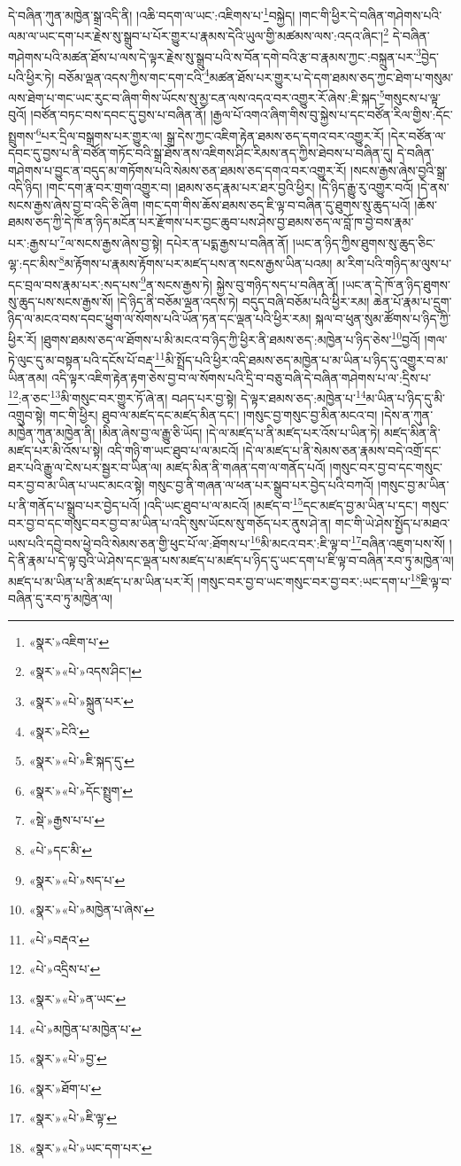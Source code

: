 དེ་བཞིན་ཀུན་མཁྱེན་སྒྲ་འདི་ནི། །འཆི་བདག་ལ་ཡང་:འཇིགས་པ་\footnote{«སྣར་»འཇིག་པ་}བསྐྱེད། །གང་གི་ཕྱིར་དེ་བཞིན་གཤེགས་པའི་ལམ་ལ་ཡང་དག་པར་རྗེས་སུ་སྒྲུབ་པ་པོར་གྱུར་པ་རྣམས་དེའི་ཡུལ་གྱི་མཚམས་ལས་:འདའ་ཞིང་།\footnote{«སྣར་»«པེ་»འདས་ཤིང་།} དེ་བཞིན་གཤེགས་པའི་མཚན་ཐོས་པ་ལས་དེ་ལྟར་རྗེས་སུ་སྒྲུབ་པའི་ས་བོན་དགེ་བའི་རྩ་བ་རྣམས་ཀྱང་:བསྐྲུན་པར་\footnote{«སྣར་»«པེ་»སྐྲུན་པར་}བྱེད་པའི་ཕྱིར་ཏེ། བཅོམ་ལྡན་འདས་ཀྱིས་གང་དག་ངའི་\footnote{«སྣར་»ངེའི་}མཚན་ཐོས་པར་གྱུར་པ་དེ་དག་ཐམས་ཅད་ཀྱང་ཐེག་པ་གསུམ་ལས་ཐེག་པ་གང་ཡང་རུང་བ་ཞིག་གིས་ཡོངས་སུ་མྱ་ངན་ལས་འདའ་བར་འགྱུར་རོ་ཞེས་:ཇི་སྐད་\footnote{«སྣར་»«པེ་»ཇི་སྐད་དུ་}གསུངས་པ་ལྟ་བུའོ། །བཙོན་བཏང་བས་དབང་དུ་བྱས་པ་བཞིན་ནོ། །རྒྱལ་པོ་འགའ་ཞིག་གིས་བུ་སྐྱེས་པ་དང་བཙོན་རིལ་གྱིས་:དོང་སྤྲུགས་\footnote{«སྣར་»«པེ་»དོང་སྤྲུག་}པར་དྲིལ་བསྒྲགས་པར་གྱུར་ལ། སྒྲ་དེས་ཀྱང་འཇིག་རྟེན་ཐམས་ཅད་དགའ་བར་འགྱུར་རོ། །དེར་བཙོན་ལ་དབང་དུ་བྱས་པ་ནི་བཙོན་གཏོང་བའི་སྒྲ་ཐོས་ནས་འཇིགས་ཤིང་རིམས་ནད་ཀྱིས་ཐེབས་པ་བཞིན་དུ། དེ་བཞིན་གཤེགས་པ་བྱུང་ན་བདུད་མ་གཏོགས་པའི་སེམས་ཅན་ཐམས་ཅད་དགའ་བར་འགྱུར་རོ། །སངས་རྒྱས་ཞེས་བྱའི་སྒྲ་འདི་ཉིད། །གང་དག་རྣ་བར་གྲག་འགྱུར་བ། །ཐམས་ཅད་རྣམ་པར་ཐར་བྱའི་ཕྱིར། །དེ་ཉིད་རྒྱུ་རུ་འགྱུར་བའོ། །དེ་ནས་སངས་རྒྱས་ཞེས་བྱ་བ་འདི་ཅི་ཞིག །གང་དག་གིས་ཆོས་ཐམས་ཅད་ཇི་ལྟ་བ་བཞིན་དུ་ཐུགས་སུ་ཆུད་པའོ། །ཆོས་ཐམས་ཅད་ཀྱི་དེ་ཁོ་ན་ཉིད་མངོན་པར་རྫོགས་པར་བྱང་ཆུབ་པས་ཤེས་བྱ་ཐམས་ཅད་ལ་བློ་ཁ་བྱེ་བས་རྣམ་པར་:རྒྱས་པ་\footnote{«སྡེ་»རྒྱས་པ་པ་}ལ་སངས་རྒྱས་ཞེས་བྱ་སྟེ། དཔེར་ན་པདྨ་རྒྱས་པ་བཞིན་ནོ། །ཡང་ན་ཉིད་ཀྱིས་ཐུགས་སུ་ཆུད་ཅིང་ལྷ་:དང་མིས་\footnote{«པེ་»དང་མི་}མ་རྟོགས་པ་རྣམས་རྟོགས་པར་མཛད་པས་ན་སངས་རྒྱས་ཡིན་པའམ། མ་རིག་པའི་གཉིད་མ་ལུས་པ་དང་བྲལ་བས་རྣམ་པར་:སད་པས་\footnote{«སྣར་»«པེ་»སད་པ་}ན་སངས་རྒྱས་ཏེ། སྐྱེས་བུ་གཉིད་སད་པ་བཞིན་ནོ། །ཡང་ན་དེ་ཁོ་ན་ཉིད་ཐུགས་སུ་ཆུད་པས་སངས་རྒྱས་སོ། །དེ་ཉིད་ནི་བཅོམ་ལྡན་འདས་ཏེ། བདུད་བཞི་བཅོམ་པའི་ཕྱིར་རམ། ཆེན་པོ་རྣམ་པ་དྲུག་ཉིད་ལ་མངའ་བས་དབང་ཕྱུག་ལ་སོགས་པའི་ཡོན་ཏན་དང་ལྡན་པའི་ཕྱིར་རམ། སྐལ་བ་ཕུན་སུམ་ཚོགས་པ་ཉིད་ཀྱི་ཕྱིར་རོ། །ཐུགས་ཐམས་ཅད་ལ་ཐོགས་པ་མི་མངའ་བ་ཉིད་ཀྱི་ཕྱིར་ནི་ཐམས་ཅད་:མཁྱེན་པ་ཉིད་ཅེས་\footnote{«སྣར་»«པེ་»མཁྱེན་པ་ཞེས་}བྱའོ། །གལ་ཏེ་ལུང་དུ་མ་བསྟན་པའི་དངོས་པོ་བརྡ་\footnote{«པེ་»བརྡའ་}མི་སྤྲོད་པའི་ཕྱིར་འདི་ཐམས་ཅད་མཁྱེན་པ་མ་ཡིན་པ་ཉིད་དུ་འགྱུར་བ་མ་ཡིན་ནམ། འདི་ལྟར་འཇིག་རྟེན་རྟག་ཅེས་བྱ་བ་ལ་སོགས་པའི་དྲི་བ་བཅུ་བཞི་དེ་བཞིན་གཤེགས་པ་ལ་:དྲིས་པ་\footnote{«པེ་»འདྲིས་པ་}:ན་ཅང་\footnote{«སྣར་»«པེ་»ན་ཡང་}མི་གསུང་བར་གྱུར་ཏོ་ཞེ་ན། བཤད་པར་བྱ་སྟེ། དེ་ལྟར་ཐམས་ཅད་:མཁྱེན་པ་\footnote{«པེ་»མཁྱེན་པ་མཁྱེན་པ་}མ་ཡིན་པ་ཉིད་དུ་མི་འགྲུབ་སྟེ། གང་གི་ཕྱིར། ཐུབ་ལ་མཛད་དང་མཛད་མིན་དང་། །གསུང་བྱ་གསུང་བྱ་མིན་མངའ་བ། །དེས་ན་ཀུན་མཁྱེན་ཀུན་མཁྱེན་ནི། །མིན་ཞེས་བྱ་ལ་རྒྱུ་ཅི་ཡོད། །དེ་ལ་མཛད་པ་ནི་མཛད་པར་འོས་པ་ཡིན་ཏེ། མཛད་མིན་ནི་མཛད་པར་མི་འོས་པ་སྟེ། འདི་གཉི་ག་ཡང་ཐུབ་པ་ལ་མངའོ། །དེ་ལ་མཛད་པ་ནི་སེམས་ཅན་རྣམས་བདེ་འགྲོ་དང་ཐར་པའི་རྒྱུ་ལ་ངེས་པར་སྦྱར་བ་ཡིན་ལ། མཛད་མིན་ནི་གཞན་དག་ལ་གནོད་པའོ། །གསུང་བར་བྱ་བ་དང་གསུང་བར་བྱ་བ་མ་ཡིན་པ་ཡང་མངའ་སྟེ། གསུང་བྱ་ནི་གཞན་ལ་ཕན་པར་སྒྲུབ་པར་བྱེད་པའི་བཀའོ། །གསུང་བྱ་མ་ཡིན་པ་ནི་གནོད་པ་སྒྲུབ་པར་བྱེད་པའོ། །འདི་ཡང་ཐུབ་པ་ལ་མངའོ། །མཛད་བ་\footnote{«སྣར་»«པེ་»བྱ་}དང་མཛད་བྱ་མ་ཡིན་པ་དང་། གསུང་བར་བྱ་བ་དང་གསུང་བར་བྱ་བ་མ་ཡིན་པ་འདི་སུས་ཡོངས་སུ་གཅོད་པར་ནུས་ཤེ་ན། གང་གི་ཡེ་ཤེས་སྤྱོད་པ་མཐའ་ཡས་པའི་དབྱེ་བས་ཕྱེ་བའི་སེམས་ཅན་གྱི་ཕུང་པོ་ལ་:ཐོགས་པ་\footnote{«སྣར་»ཐོག་པ་}མི་མངའ་བར་:ཇི་ལྟ་བ་\footnote{«སྣར་»«པེ་»ཇི་ལྟ་}བཞིན་འཇུག་པས་སོ། །དེ་ནི་རྣམ་པ་དེ་ལྟ་བུའི་ཡེ་ཤེས་དང་ལྡན་པས་མཛད་པ་མཛད་པ་ཉིད་དུ་ཡང་དག་པ་ཇི་ལྟ་བ་བཞིན་རབ་ཏུ་མཁྱེན་ལ། མཛད་པ་མ་ཡིན་པ་ནི་མཛད་པ་མ་ཡིན་པར་རོ། །གསུང་བར་བྱ་བ་ཡང་གསུང་བར་བྱ་བར་:ཡང་དག་པ་\footnote{«སྣར་»«པེ་»ཡང་དག་པར་}ཇི་ལྟ་བ་བཞིན་དུ་རབ་ཏུ་མཁྱེན་ལ། 